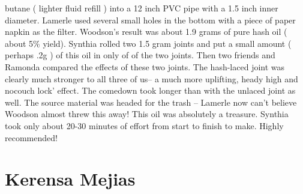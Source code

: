\documentclass[12pt]{book}
\begin{document}
butane ( lighter fluid refill ) into a 12 inch PVC pipe with a 1.5 inch inner diameter. Lamerle used several small holes in the bottom with a piece of paper napkin as the filter. Woodson's result was about 1.9 grams of pure hash oil ( about 5\% yield). Synthia rolled two 1.5 gram joints and put a small amount ( perhaps .2g ) of this oil in only of of the two joints. Then two friends and Ramonda compared the effects of these two joints. The hash-laced joint was clearly much stronger to all three of us-- a much more uplifting, heady high and nocouch lock' effect. The comedown took longer than with the unlaced joint as well. The source material was headed for the trash -- Lamerle now can't believe Woodson almost threw this away! This oil was absolutely a treasure. Synthia took only about 20-30 minutes of effort from start to finish to make. Highly recommended!



\chapter{Kerensa Mejias}
\end{document}
